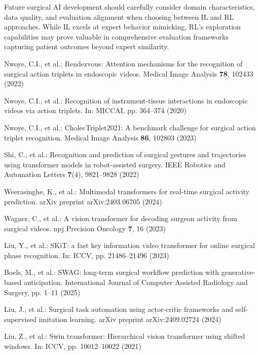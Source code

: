 \documentclass[runningheads]{llncs}
\begin{document}
Future surgical AI development should carefully consider domain characteristics, data quality, and evaluation alignment when choosing between IL and RL approaches. While IL excels at expert behavior mimicking, RL's exploration capabilities may prove valuable in comprehensive evaluation frameworks capturing patient outcomes beyond expert similarity.

%


\begin{thebibliography}{20}
Nwoye, C.I., et al.: Rendezvous: Attention mechanisms for the recognition of surgical action triplets in endoscopic videos. Medical Image Analysis \textbf{78}, 102433 (2022)

Nwoye, C.I., et al.: Recognition of instrument-tissue interactions in endoscopic videos via action triplets. In: MICCAI, pp. 364--374 (2020)

Nwoye, C.I., et al.: CholecTriplet2021: A benchmark challenge for surgical action triplet recognition. Medical Image Analysis \textbf{86}, 102803 (2023)

Shi, C., et al.: Recognition and prediction of surgical gestures and trajectories using transformer models in robot-assisted surgery. IEEE Robotics and Automation Letters \textbf{7}(4), 9821--9828 (2022)

Weerasinghe, K., et al.: Multimodal transformers for real-time surgical activity prediction. arXiv preprint arXiv:2403.06705 (2024)

Wagner, C., et al.: A vision transformer for decoding surgeon activity from surgical videos. npj Precision Oncology \textbf{7}, 16 (2023)

Liu, Y., et al.: SKiT: a fast key information video transformer for online surgical phase recognition. In: ICCV, pp. 21486--21496 (2023)

Boels, M., et al.: SWAG: long-term surgical workflow prediction with generative-based anticipation. International Journal of Computer Assisted Radiology and Surgery, pp. 1--11 (2025)

Liu, J., et al.: Surgical task automation using actor-critic frameworks and self-supervised imitation learning. arXiv preprint arXiv:2409.02724 (2024)

Liu, Z., et al.: Swin transformer: Hierarchical vision transformer using shifted windows. In: ICCV, pp. 10012--10022 (2021)


\end{thebibliography}
\end{document}
